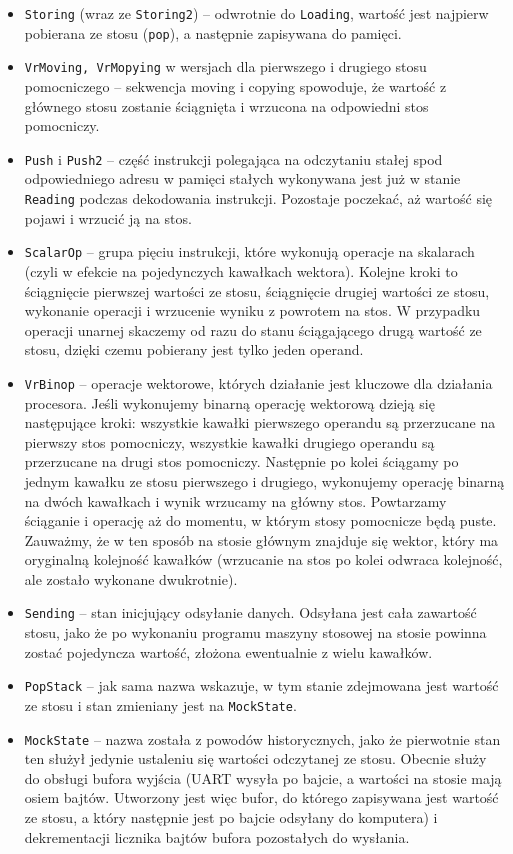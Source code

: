 \begin{itemize}
  \item \texttt{Storing} (wraz ze \texttt{Storing2}) -- odwrotnie do \texttt{Loading}, wartość jest najpierw pobierana ze stosu (\texttt{pop}), a następnie zapisywana do pamięci.
  \item \texttt{VrMoving, VrMopying} w wersjach dla pierwszego i drugiego stosu pomocniczego -- sekwencja moving i copying spowoduje, że wartość z głównego stosu zostanie ściągnięta i wrzucona na odpowiedni stos pomocniczy.
  \item \texttt{Push} i \texttt{Push2} -- część instrukcji polegająca na odczytaniu stałej spod odpowiedniego adresu w pamięci stałych wykonywana jest już w stanie \texttt{Reading} podczas dekodowania instrukcji. Pozostaje poczekać, aż wartość się pojawi i wrzucić ją na stos.
  \item \texttt{ScalarOp} -- grupa pięciu instrukcji, które wykonują operacje na skalarach (czyli w efekcie na pojedynczych kawałkach wektora). Kolejne kroki to ściągnięcie pierwszej wartości ze stosu, ściągnięcie drugiej wartości ze stosu, wykonanie operacji i wrzucenie wyniku z powrotem na stos. W przypadku operacji unarnej skaczemy od razu do stanu ściągającego drugą wartość ze stosu, dzięki czemu pobierany jest tylko jeden operand.
  \item \texttt{VrBinop} -- operacje wektorowe, których działanie jest kluczowe dla działania procesora. Jeśli wykonujemy binarną operację wektorową dzieją się następujące kroki: wszystkie kawałki pierwszego operandu są przerzucane na pierwszy stos pomocniczy, wszystkie kawałki drugiego operandu są przerzucane na drugi stos pomocniczy. Następnie po kolei ściągamy po jednym kawałku ze stosu pierwszego i drugiego, wykonujemy operację binarną na dwóch kawałkach i wynik wrzucamy na główny stos. Powtarzamy ściąganie i operację aż do momentu, w którym stosy pomocnicze będą puste. Zauważmy, że w ten sposób na stosie głównym znajduje się wektor, który ma oryginalną kolejność kawałków (wrzucanie na stos po kolei odwraca kolejność, ale zostało wykonane dwukrotnie).
  \item \texttt{Sending} -- stan inicjujący odsyłanie danych. Odsyłana jest cała zawartość stosu, jako że po wykonaniu programu maszyny stosowej na stosie powinna zostać pojedyncza wartość, złożona ewentualnie z wielu kawałków.
  \item \texttt{PopStack} -- jak sama nazwa wskazuje, w tym stanie zdejmowana jest wartość ze stosu i stan zmieniany jest na \texttt{MockState}.
  \item \texttt{MockState} -- nazwa została z powodów historycznych, jako że pierwotnie stan ten służył jedynie ustaleniu się wartości odczytanej ze stosu. Obecnie służy do obsługi bufora wyjścia (UART wysyła po bajcie, a wartości na stosie mają osiem bajtów. Utworzony jest więc bufor, do którego zapisywana jest wartość ze stosu, a który następnie jest po bajcie odsyłany do komputera) i dekrementacji licznika bajtów bufora pozostałych do wysłania.

\end{itemize}
